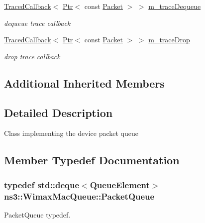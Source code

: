 \begin{DoxyCompactItemize}
\hyperlink{classns3_1_1TracedCallback}{Traced\+Callback}$<$ \hyperlink{classns3_1_1Ptr}{Ptr}$<$ const \hyperlink{classns3_1_1Packet}{Packet} $>$ $>$ \hyperlink{classns3_1_1WimaxMacQueue_a3a84896e087a831d26cb904927e8cbed}{m\+\_\+trace\+Dequeue}
\begin{DoxyCompactList}\small\item\em dequeue trace callback \end{DoxyCompactList}\item 
\hyperlink{classns3_1_1TracedCallback}{Traced\+Callback}$<$ \hyperlink{classns3_1_1Ptr}{Ptr}$<$ const \hyperlink{classns3_1_1Packet}{Packet} $>$ $>$ \hyperlink{classns3_1_1WimaxMacQueue_af12e3058d4bac6a194db0fa730c2b81a}{m\+\_\+trace\+Drop}
\begin{DoxyCompactList}\small\item\em drop trace callback \end{DoxyCompactList}\end{DoxyCompactItemize}
\subsection*{Additional Inherited Members}


\subsection{Detailed Description}
Class implementing the device packet queue 

\subsection{Member Typedef Documentation}
\subsubsection[{\texorpdfstring{Packet\+Queue}{PacketQueue}}]{\setlength{\rightskip}{0pt plus 5cm}typedef std\+::deque$<${\bf Queue\+Element}$>$ {\bf ns3\+::\+Wimax\+Mac\+Queue\+::\+Packet\+Queue}\hspace{0.3cm}{\ttfamily [private]}}\hypertarget{classns3_1_1WimaxMacQueue_a075c9b703ce5eef7fe1844db1758657a}{}\label{classns3_1_1WimaxMacQueue_a075c9b703ce5eef7fe1844db1758657a}


Packet\+Queue typedef. 



